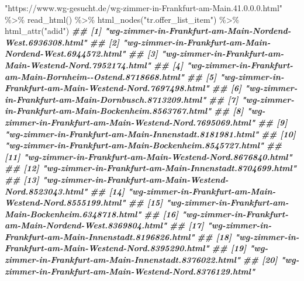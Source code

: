 \documentclass[
  ngerman,
]{article}
\newenvironment{Shaded}{\begin{snugshade}}{\end{snugshade}}
\newcommand{\DocumentationTok}[1]{\textcolor[rgb]{0.56,0.35,0.01}{\textbf{\textit{#1}}}}
\newcommand{\FunctionTok}[1]{\textcolor[rgb]{0.00,0.00,0.00}{#1}}
\newcommand{\NormalTok}[1]{#1}
\newcommand{\SpecialCharTok}[1]{\textcolor[rgb]{0.00,0.00,0.00}{#1}}
\newcommand{\StringTok}[1]{\textcolor[rgb]{0.31,0.60,0.02}{#1}}
\begin{document}
\begin{Shaded}
\begin{Highlighting}[]
\StringTok{"https://www.wg{-}gesucht.de/wg{-}zimmer{-}in{-}Frankfurt{-}am{-}Main.41.0.0.0.html"} \SpecialCharTok{\%\textgreater{}\%}
  \FunctionTok{read\_html}\NormalTok{() }\SpecialCharTok{\%\textgreater{}\%}
  \FunctionTok{html\_nodes}\NormalTok{(}\StringTok{"tr.offer\_list\_item"}\NormalTok{) }\SpecialCharTok{\%\textgreater{}\%}
  \FunctionTok{html\_attr}\NormalTok{(}\StringTok{"adid"}\NormalTok{)}
\DocumentationTok{\#\#  [1] "wg{-}zimmer{-}in{-}Frankfurt{-}am{-}Main{-}Nordend{-}West.6936308.html"    }
\DocumentationTok{\#\#  [2] "wg{-}zimmer{-}in{-}Frankfurt{-}am{-}Main{-}Nordend{-}West.6944572.html"    }
\DocumentationTok{\#\#  [3] "wg{-}zimmer{-}in{-}Frankfurt{-}am{-}Main{-}Westend{-}Nord.7952174.html"    }
\DocumentationTok{\#\#  [4] "wg{-}zimmer{-}in{-}Frankfurt{-}am{-}Main{-}Bornheim{-}{-}Ostend.8718668.html"}
\DocumentationTok{\#\#  [5] "wg{-}zimmer{-}in{-}Frankfurt{-}am{-}Main{-}Westend{-}Nord.7697498.html"    }
\DocumentationTok{\#\#  [6] "wg{-}zimmer{-}in{-}Frankfurt{-}am{-}Main{-}Dornbusch.8713209.html"       }
\DocumentationTok{\#\#  [7] "wg{-}zimmer{-}in{-}Frankfurt{-}am{-}Main{-}Bockenheim.8563767.html"      }
\DocumentationTok{\#\#  [8] "wg{-}zimmer{-}in{-}Frankfurt{-}am{-}Main{-}Westend{-}Nord.7695069.html"    }
\DocumentationTok{\#\#  [9] "wg{-}zimmer{-}in{-}Frankfurt{-}am{-}Main{-}Innenstadt.8181981.html"      }
\DocumentationTok{\#\# [10] "wg{-}zimmer{-}in{-}Frankfurt{-}am{-}Main{-}Bockenheim.8545727.html"      }
\DocumentationTok{\#\# [11] "wg{-}zimmer{-}in{-}Frankfurt{-}am{-}Main{-}Westend{-}Nord.8676840.html"    }
\DocumentationTok{\#\# [12] "wg{-}zimmer{-}in{-}Frankfurt{-}am{-}Main{-}Innenstadt.8704699.html"      }
\DocumentationTok{\#\# [13] "wg{-}zimmer{-}in{-}Frankfurt{-}am{-}Main{-}Westend{-}Nord.8523043.html"    }
\DocumentationTok{\#\# [14] "wg{-}zimmer{-}in{-}Frankfurt{-}am{-}Main{-}Westend{-}Nord.8555199.html"    }
\DocumentationTok{\#\# [15] "wg{-}zimmer{-}in{-}Frankfurt{-}am{-}Main{-}Bockenheim.6348718.html"      }
\DocumentationTok{\#\# [16] "wg{-}zimmer{-}in{-}Frankfurt{-}am{-}Main{-}Nordend{-}West.8369804.html"    }
\DocumentationTok{\#\# [17] "wg{-}zimmer{-}in{-}Frankfurt{-}am{-}Main{-}Innenstadt.8196826.html"      }
\DocumentationTok{\#\# [18] "wg{-}zimmer{-}in{-}Frankfurt{-}am{-}Main{-}Westend{-}Nord.8395290.html"    }
\DocumentationTok{\#\# [19] "wg{-}zimmer{-}in{-}Frankfurt{-}am{-}Main{-}Innenstadt.8376022.html"      }
\DocumentationTok{\#\# [20] "wg{-}zimmer{-}in{-}Frankfurt{-}am{-}Main{-}Westend{-}Nord.8376129.html"}
\end{Highlighting}
\end{Shaded}
\end{document}
